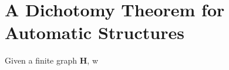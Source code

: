 \chapter{A Dichotomy Theorem for Automatic Structures}

\begin{theorem}
	Given a finite graph $\mathbf{H}$, w
\end{theorem}
